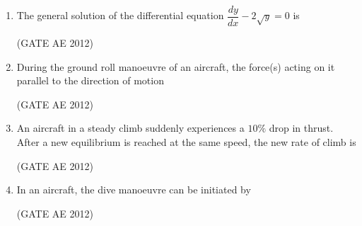 \documentclass[journal,12pt,onecolumn]{IEEEtran}
\theoremstyle{remark}
\begin{document}
\begin{enumerate}
\item The general solution of the differential equation $\dfrac{dy}{dx}-2\sqrt{y}=0$ is
\begin{enumerate}
\end{enumerate}
\hfill(GATE AE 2012)



\item During the ground roll manoeuvre of an aircraft, the force(s) acting on it parallel to the direction of motion
\begin{enumerate}
\end{enumerate}
\hfill(GATE AE 2012)



\item An aircraft in a steady climb suddenly experiences a $10\%$ drop in thrust. After a new equilibrium is reached at the same speed, the new rate of climb is
\begin{enumerate}
\end{enumerate}
\hfill(GATE AE 2012)



\item In an aircraft, the dive manoeuvre can be initiated by
\begin{enumerate}
\end{enumerate}
\hfill(GATE AE 2012)




\end{enumerate}
\end{document}
